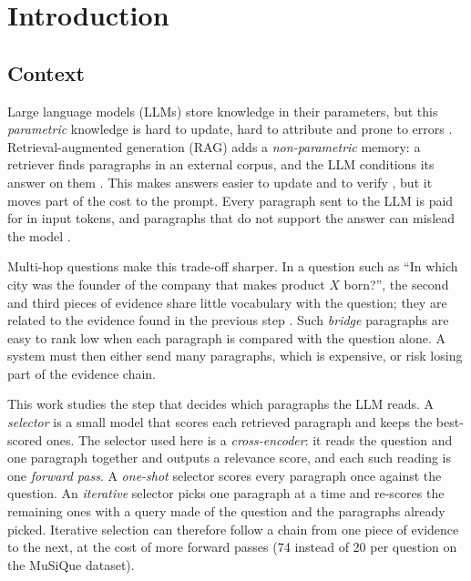 \chapter{Introduction}
\label{chap:intro}

\section{Context}

Large language models (LLMs) store knowledge in their parameters, but this \emph{parametric} knowledge is hard to update, hard to attribute and prone to errors \cite{pmlr-v119-guu20a,3495724.3496517,liu2026unifieddefinitionhallucinationits}. Retrieval-augmented generation (RAG) adds a \emph{non-parametric} memory: a retriever finds paragraphs in an external corpus, and the LLM conditions its answer on them \cite{3495724.3496517,pmlr-v119-guu20a}. This makes answers easier to update and to verify \cite{3495724.3496517}, but it moves part of the cost to the prompt. Every paragraph sent to the LLM is paid for in input tokens, and paragraphs that do not support the answer can mislead the model \cite{shi2023distracted,wang2023filco}.

Multi-hop questions make this trade-off sharper. In a question such as ``In which city was the founder of the company that makes product $X$ born?'', the second and third pieces of evidence share little vocabulary with the question; they are related to the evidence found in the previous step \cite{yang2018hotpotqa,trivedi2022musique}. Such \emph{bridge} paragraphs are easy to rank low when each paragraph is compared with the question alone. A system must then either send many paragraphs, which is expensive, or risk losing part of the evidence chain.

This work studies the step that decides which paragraphs the LLM reads. A \emph{selector} is a small model that scores each retrieved paragraph and keeps the best-scored ones. The selector used here is a \emph{cross-encoder}: it reads the question and one paragraph together and outputs a relevance score, and each such reading is one \emph{forward pass}. A \emph{one-shot} selector scores every paragraph once against the question. An \emph{iterative} selector picks one paragraph at a time and re-scores the remaining ones with a query made of the question and the paragraphs already picked. Iterative selection can therefore follow a chain from one piece of evidence to the next, at the cost of more forward passes (74 instead of 20 per question on the MuSiQue dataset).

